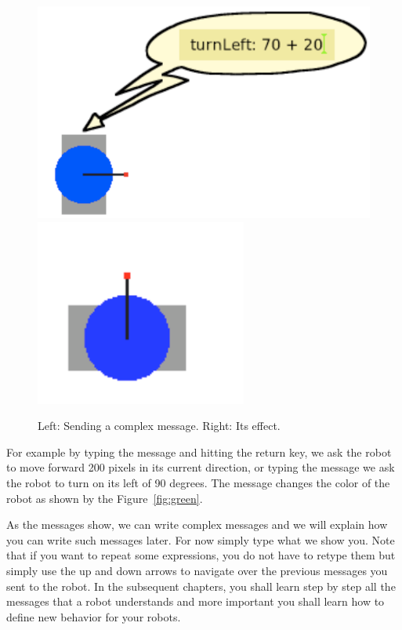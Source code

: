 \begin{figure}[!h]\centerline{\includegraphics{turn20+702}\hfill\includegraphics{turned2}}
\caption{Left: Sending a complex message. Right: Its effect.\label{fig:turned}}
\end{figure}

 For example by typing the message  and hitting the return key, we ask the robot to move forward 200 pixels in its current direction, or typing the message  we ask the robot to turn on its left of 90 degrees. The message  changes the color of the robot as shown by the Figure~\ref{fig:green}.

As the messages show, we can write complex messages and we will explain how you can write such messages later. For now simply type what we show you. Note that if you want to repeat some expressions, you do not have to retype them but simply use the up and down arrows to navigate over the previous messages you sent to the robot. In the subsequent chapters, you shall learn step by step all the messages that a robot understands and more important you shall learn how to define new behavior for your robots.





